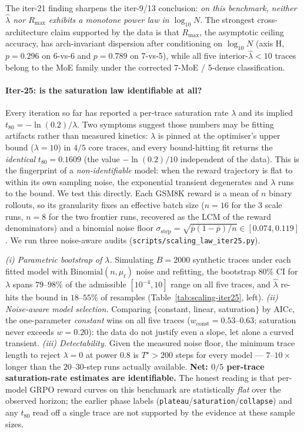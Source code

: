 The iter-21 finding sharpens the iter-9/13 conclusion:
\emph{on this benchmark, neither $\hat\lambda$ nor $R_{\max}$ exhibits
a monotone power law in $\log_{10} N$}.  The strongest
cross-architecture claim supported by the data is that
$R_{\max}$, the asymptotic ceiling accuracy, has arch-invariant
dispersion after conditioning on $\log_{10}N$ (axis H,
$p = 0.296$ on 6-vs-6 and $p = 0.789$ on 7-vs-5), while all five
interior-$\hat\lambda < 10$ traces belong to the MoE family under
the corrected 7-MoE / 5-dense classification.

\paragraph{Iter-25: is the saturation law identifiable at all?}
\label{par:scaling-iter25}
Every iteration so far has reported a per-trace saturation rate
$\lambda$ and its implied $t_{80}=-\ln(0.2)/\lambda$. Two symptoms
suggest those numbers may be fitting artifacts rather than measured
kinetics: $\lambda$ is pinned at the optimiser's upper bound
($\lambda\!=\!10$) in $4/5$ core traces, and every bound-hitting fit
returns the \emph{identical} $t_{80}=0.1609$ (the value $-\ln(0.2)/10$
independent of the data). This is the fingerprint of a
\emph{non-identifiable} model: when the reward trajectory is flat to
within its own sampling noise, the exponential transient degenerates
and $\lambda$ runs to the bound. We test this directly. Each GSM8K
reward is a mean of $n$ binary rollouts, so its granularity fixes an
effective batch size ($n=16$ for the 3 scale runs, $n=8$ for the two
frontier runs, recovered as the LCM of the reward denominators) and a
binomial noise floor $\sigma_{\text{step}}=\sqrt{\bar p(1-\bar p)/n}\in
[0.074,0.119]$. We run three noise-aware audits
(\texttt{scripts/scaling\_law\_iter25.py}).

\emph{(i) Parametric bootstrap of $\lambda$.} Simulating $B=2000$
synthetic traces under each fitted model with $\mathrm{Binomial}(n,\mu_t)$
noise and refitting, the bootstrap $80\%$ CI for $\lambda$ spans
$79$--$98\%$ of the admissible $[10^{-4},10]$ range on all five traces,
and $\hat\lambda$ re-hits the bound in $18$--$55\%$ of resamples
(Table~\ref{tab:scaling-iter25}, left). \emph{(ii) Noise-aware model
selection.} Comparing $\{$constant, linear, saturation$\}$ by AICc, the
one-parameter \emph{constant} wins on all five traces
($w_{\text{const}}=0.53$--$0.63$; saturation never exceeds $w=0.20$):
the data do not justify even a slope, let alone a curved transient.
\emph{(iii) Detectability.} Given the measured noise floor, the minimum
trace length to reject $\lambda=0$ at power $0.8$ is
$T^\star>200$ steps for every model --- $7$--$10\times$ longer than the
$20$--$30$-step runs actually available. \textbf{Net: $0/5$ per-trace
saturation-rate estimates are identifiable.} The honest reading is that
per-model GRPO reward curves on this benchmark are statistically
\emph{flat} over the observed horizon; the earlier phase labels
(\texttt{plateau}/\texttt{saturation}/\texttt{collapse}) and any
$t_{80}$ read off a single trace are not supported by the evidence at
these sample sizes.

